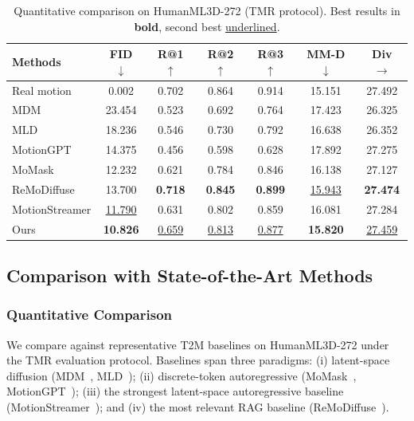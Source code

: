 \documentclass{article}
\begin{document}
\begin{table}[t]
\centering
\caption{Quantitative comparison on HumanML3D-272 (TMR protocol). Best results in \textbf{bold}, second best \underline{underlined}.}
\label{tab:sota}
\begin{tabular}{lcccccc}
\toprule
Methods & FID $\downarrow$ & R@1 $\uparrow$ & R@2 $\uparrow$ & R@3 $\uparrow$ & MM-D $\downarrow$ & Div $\rightarrow$ \\
\midrule
Real motion & 0.002 & 0.702 & 0.864 & 0.914 & 15.151 & 27.492 \\
\midrule
MDM \citep{tevet2022human} & 23.454 & 0.523 & 0.692 & 0.764 & 17.423 & 26.325 \\
MLD \citep{chen2023executing} & 18.236 & 0.546 & 0.730 & 0.792 & 16.638 & 26.352 \\
MotionGPT \citep{jiang2023motiongpt} & 14.375 & 0.456 & 0.598 & 0.628 & 17.892 & 27.275 \\
MoMask \citep{guo2024momask} & 12.232 & 0.621 & 0.784 & 0.846 & 16.138 & 27.127 \\
ReMoDiffuse \citep{zhang2023remodiffuse} & 13.700 & \textbf{0.718} & \textbf{0.845} & \textbf{0.899} & \underline{15.943} & \textbf{27.474} \\
MotionStreamer \citep{xiao2025motionstreamer} & \underline{11.790} & 0.631 & 0.802 & 0.859 & 16.081 & 27.284 \\
\midrule
Ours & \textbf{10.826} & \underline{0.659} & \underline{0.813} & \underline{0.877} & \textbf{15.820} & \underline{27.459} \\
\bottomrule
\end{tabular}
\end{table}



\subsection{Comparison with State-of-the-Art Methods}

\subsubsection{Quantitative Comparison}

We compare against representative T2M baselines on HumanML3D-272 under the TMR evaluation protocol.
Baselines span three paradigms: (i) latent-space diffusion (MDM~\citep{tevet2022human}, MLD~\citep{chen2023executing}); (ii) discrete-token autoregressive (MoMask~\citep{guo2024momask}, MotionGPT~\citep{jiang2023motiongpt}); (iii) the strongest latent-space autoregressive baseline (MotionStreamer~\citep{xiao2025motionstreamer}); and (iv) the most relevant RAG baseline (ReMoDiffuse~\citep{zhang2023remodiffuse}).
\end{document}
